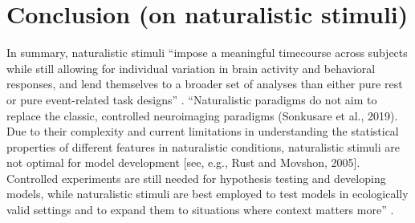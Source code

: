 \section{Conclusion (on naturalistic stimuli)}
%
In summary, naturalistic stimuli ``impose a meaningful timecourse across
subjects while still allowing for individual variation in brain activity and
behavioral responses, and lend themselves to a broader set of analyses than
either pure rest or pure event-related task designs'' \citep{finn2017can}.
%
``Naturalistic paradigms do not aim to replace the classic, controlled
neuroimaging paradigms (Sonkusare et al., 2019). Due to their complexity and
current limitations in understanding the statistical properties of different
features in naturalistic conditions, naturalistic stimuli are not optimal for
model development [see, e.g., Rust and Movshon, 2005]. Controlled experiments
are still needed for hypothesis testing and developing models, while
naturalistic stimuli are best employed to test models in ecologically valid
settings and to expand them to situations where context matters
more'' \citep{saarimaki2021naturalistic}.
